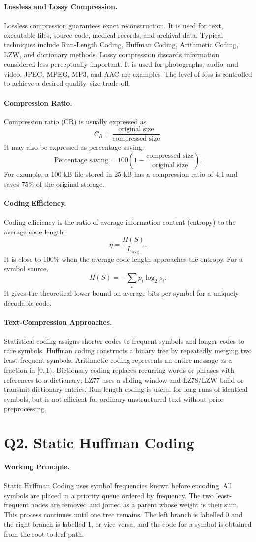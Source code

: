 \documentclass[12pt,a4paper]{article}
\newcommand{\qheading}[1]{\section*{#1}}
\newcommand{\topic}[1]{\paragraph{\color{navy}#1.}}
\begin{document}
\topic{Lossless and Lossy Compression}
Lossless compression guarantees exact reconstruction. It is used for text, executable files, source code, medical records, and archival data. Typical techniques include Run-Length Coding, Huffman Coding, Arithmetic Coding, LZW, and dictionary methods. Lossy compression discards information considered less perceptually important. It is used for photographs, audio, and video. JPEG, MPEG, MP3, and AAC are examples. The level of loss is controlled to achieve a desired quality--size trade-off.

\topic{Compression Ratio}
Compression ratio (CR) is usually expressed as
\[
C_R=\frac{\text{original size}}{\text{compressed size}}.
\]
It may also be expressed as percentage saving:
\[
\text{Percentage saving}=100\left(1-\frac{\text{compressed size}}{\text{original size}}\right).
\]
For example, a 100 kB file stored in 25 kB has a compression ratio of 4:1 and saves 75\% of the original storage.

\topic{Coding Efficiency}
Coding efficiency is the ratio of average information content (entropy) to the average code length:
\[
\eta=\frac{H(S)}{L_{\text{avg}}}.
\]
It is close to 100\% when the average code length approaches the entropy. For a symbol source,
\[
H(S)=-\sum_i p_i\log_2 p_i.
\]
It gives the theoretical lower bound on average bits per symbol for a uniquely decodable code.

\topic{Text-Compression Approaches}
Statistical coding assigns shorter codes to frequent symbols and longer codes to rare symbols. Huffman coding constructs a binary tree by repeatedly merging two least-frequent symbols. Arithmetic coding represents an entire message as a fraction in \([0,1)\). Dictionary coding replaces recurring words or phrases with references to a dictionary; LZ77 uses a sliding window and LZ78/LZW build or transmit dictionary entries. Run-length coding is useful for long runs of identical symbols, but is not efficient for ordinary unstructured text without prior preprocessing.

\clearpage
\qheading{Q2. Static Huffman Coding}

\topic{Working Principle}
Static Huffman Coding uses symbol frequencies known before encoding. All symbols are placed in a priority queue ordered by frequency. The two least-frequent nodes are removed and joined as a parent whose weight is their sum. This process continues until one tree remains. The left branch is labelled 0 and the right branch is labelled 1, or vice versa, and the code for a symbol is obtained from the root-to-leaf path.
\end{document}
